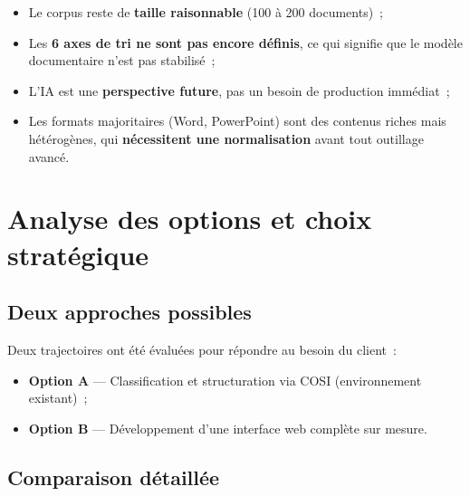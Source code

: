 \documentclass[12pt, a4paper]{article}
\begin{document}
\begin{itemize}[leftmargin=1.5em]
  \item Le corpus reste de \textbf{taille raisonnable} (100 à 200 documents)~;
  \item Les \textbf{6 axes de tri ne sont pas encore définis}, ce qui signifie que le modèle documentaire n'est pas stabilisé~;
  \item L'IA est une \textbf{perspective future}, pas un besoin de production immédiat~;
  \item Les formats majoritaires (Word, PowerPoint) sont des contenus riches mais hétérogènes, qui \textbf{nécessitent une normalisation} avant tout outillage avancé.
\end{itemize}

\section{Analyse des options et choix stratégique}

\subsection{Deux approches possibles}

Deux trajectoires ont été évaluées pour répondre au besoin du client~:

\begin{itemize}[leftmargin=1.5em]
  \item \textbf{Option A} --- Classification et structuration via COSI (environnement existant)~;
  \item \textbf{Option B} --- Développement d'une interface web complète sur mesure.
\end{itemize}

\subsection{Comparaison détaillée}
\end{document}
